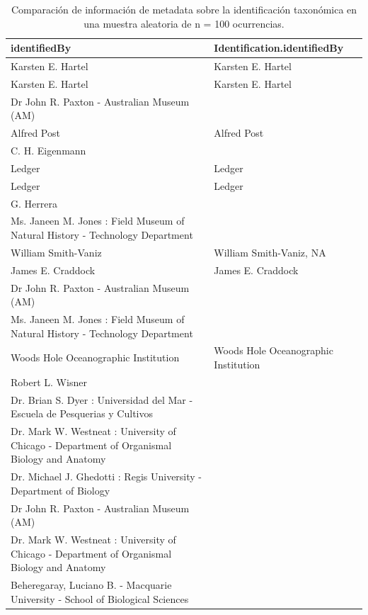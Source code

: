 \documentclass[sn-apa,pdflatex]{sn-jnl}
\begin{document}
\begin{longtable}[t]{>{\raggedright\arraybackslash}p{25em}>{\raggedright\arraybackslash}p{25em}}
\caption{\label{tab:idigbiot1}Comparación de información de metadata sobre la identificación taxonómica en una muestra aleatoria de n = 100 ocurrencias.}\\
\toprule
identifiedBy & Identification.identifiedBy\\
\midrule
Karsten E. Hartel & Karsten E. \vphantom{1} Hartel\\
Karsten E. Hartel & Karsten E. Hartel\\
Dr John R. Paxton - Australian Museum (AM) \vphantom{3} & \\
Alfred Post & Alfred Post\\
C. H. Eigenmann \vphantom{2} & \\
\addlinespace
Ledger & \vphantom{4} Ledger\\
Ledger & \vphantom{3} Ledger\\
G. Herrera & \\
Ms. Janeen M. Jones : Field Museum of Natural History - Technology Department \vphantom{2} & \\
William Smith-Vaniz & William Smith-Vaniz, NA\\
\addlinespace
James E. Craddock & James E. \vphantom{4} Craddock\\
Dr John R. Paxton - Australian Museum (AM) \vphantom{2} & \\
Ms. Janeen M. Jones : Field Museum of Natural History - Technology Department \vphantom{1} & \\
Woods Hole Oceanographic Institution & Woods Hole Oceanographic \vphantom{7} Institution\\
Robert L. Wisner & \\
\addlinespace
Dr. Brian S. Dyer : Universidad del Mar - Escuela de Pesquerias y Cultivos & \\
Dr. Mark W. Westneat : University of Chicago - Department of Organismal Biology and Anatomy \vphantom{12} & \\
Dr. Michael J. Ghedotti : Regis University - Department of Biology & \\
Dr John R. Paxton - Australian Museum (AM) \vphantom{1} & \\
Dr. Mark W. Westneat : University of Chicago - Department of Organismal Biology and Anatomy \vphantom{11} & \\
\addlinespace
Beheregaray, Luciano B. - Macquarie University - School of Biological Sciences & \\

\end{longtable}
\end{document}
